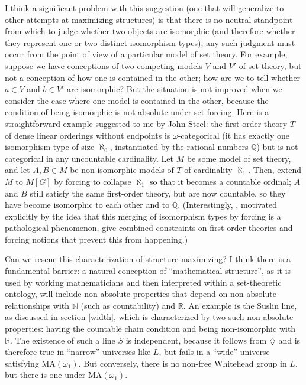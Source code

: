 \documentclass[letterpaper,12pt]{article}
\newcommand{\N}{\mathbb{N}}
\newcommand{\R}{\mathbb{R}}
\newcommand{\Q}{\mathbb{Q}}
\begin{document}
I think a significant problem with this suggestion (one that will generalize to other attempts at maximizing structures) is that there is no neutral standpoint from which to judge whether two objects are isomorphic (and therefore whether they represent one or two distinct isomorphism types); any such judgment must occur from the point of view of a particular model of set theory. For example, suppose we have conceptions of two competing models $V$ and $V'$ of set theory, but not a conception of how one is contained in the other; how are we to tell whether $a \in V$ and $b \in V'$ are isomorphic? But the situation is not improved when we consider the case where one model is contained in the other, because the condition of being isomorphic is not absolute under set forcing. Here is a straightforward example suggested to me by John Steel: the first-order theory $T$ of dense linear orderings without endpoints is $\omega$-categorical (it has exactly one isomorphism type of size $\aleph_0$, instantiated by the rational numbers $\Q$) but is not categorical in any uncountable cardinality. Let $M$ be some model of set theory, and let $A, B \in M$ be non-isomorphic models of $T$ of cardinality $\aleph_1$. Then, extend $M$ to $M[G]$ by forcing to collapse $\aleph_1$ so that it becomes a countable ordinal; $A$ and $B$ still satisfy the same first-order theory, but are now countable, so they have become isomorphic to each other and to $\Q$. (Interestingly, \cite{baldwin1993}, motivated explicitly by the idea that this merging of isomorphism types by forcing is a pathological phenomenon, give combined constraints on first-order theories and forcing notions that prevent this from happening.)

Can we rescue this characterization of structure-maximizing? I think there is a fundamental barrier: a natural conception of ``mathematical structure'', as it is used by working mathematicians and then interpreted within a set-theoretic ontology, will include non-absolute properties that depend on non-absolute relationships with $\N$ (such as countability) and $\R$. An example is the Suslin line, as discussed in section \ref{width}, which is characterized by two such non-absolute properties: having the countable chain condition and being non-isomorphic with $\R$. The existence of such a line $S$ is independent, because it follows from $\diamondsuit$ and is therefore true in ``narrow'' universes like $L$, but fails in a ``wide'' universe satisfying $\mathrm{MA}(\omega_1)$. But conversely, there is no non-free Whitehead group in $L$, but there is one under $\mathrm{MA}(\omega_1)$.
\end{document}
